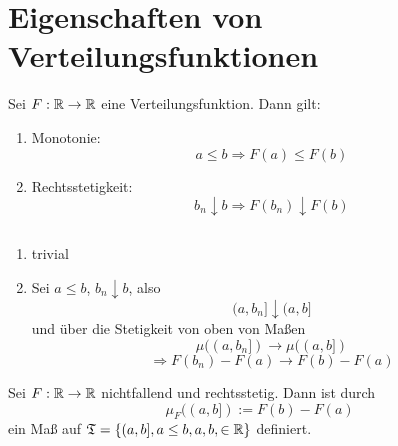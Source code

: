		\section{Eigenschaften von Verteilungsfunktionen}
			\begin{satz}
				Sei $F:\mathbb{R}\to\mathbb{R}$ eine Verteilungsfunktion. Dann gilt:
				\begin{enumerate}
					\item Monotonie:
					\[ a\le b\Rightarrow F(a)\le F(b) \]
					\item Rechtsstetigkeit:
					\[ b_n\downarrow b\Rightarrow F(b_n)\downarrow F(b) \]
				\end{enumerate}
			\end{satz}
			
			\begin{bew} $\text{  }$ %
				
				\begin{enumerate}
					\item trivial
					\item Sei $a\le b$, $b_n\downarrow b$, also
					\[ (a,b_n]\downarrow (a,b] \]
					und über die Stetigkeit von oben von Maßen
					\[ \mu((a,b_n])\to \mu((a,b]) \]
					\[ \Rightarrow F(b_n)-F(a)\to F(b)-F(a) \]
				\end{enumerate}
			\end{bew}
			
			\begin{satz}
				Sei $F:\mathbb{R}\to\mathbb{R}$ nichtfallend und rechtsstetig. Dann ist durch 
				\[ \mu_F((a,b]):=F(b)-F(a) \]
				ein Maß auf $\mathfrak{T}=\{(a,b], a\le b, a,b,\in\mathbb{R}\}$ definiert.
			\end{satz}
			
